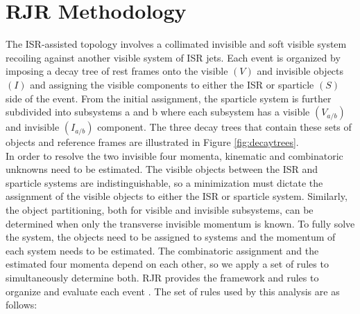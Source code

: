 \section{ RJR Methodology}
 The ISR-assisted topology involves a collimated invisible and soft visible system recoiling against another visible system of ISR jets. Each event is organized by imposing a decay tree of rest frames onto the visible $(V)$ and invisible objects $(I)$ and assigning the visible components to either the ISR or sparticle $(S)$ side of the event. From the initial assignment, the sparticle system is further subdivided into subsystems a and b where each subsystem has a visible $(V_{a/b})$ and invisible  $(I_{a/b})$ component. The three decay trees that contain these sets of objects and reference frames are illustrated in Figure \ref{fig:decaytrees}. \\
In order to resolve the two invisible four momenta, kinematic and combinatoric unknowns need to be estimated. The visible objects between the ISR and sparticle systems are indistinguishable, so a minimization must dictate the assignment of the visible objects to either the ISR or sparticle system. Similarly, the object partitioning, both for visible and invisible subsystems, can be determined when only the transverse invisible momentum is known. To fully solve the system, the objects need to be assigned to systems and the momentum of each system needs to be estimated. The combinatoric assignment and the estimated four momenta depend on each other, so we  apply a set of rules to simultaneously determine both.  RJR provides the framework and rules to organize and evaluate each event \cite{PhysRevD.96.112007}. The set of rules used by this analysis are as follows:
